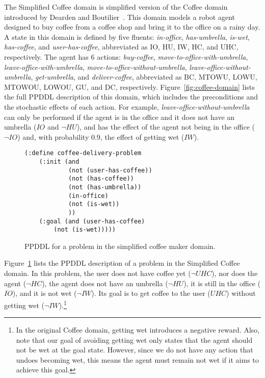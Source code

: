 \documentclass[letterpaper]{article} %
\newcommand{\inoffice}{\textit{in-office}\xspace}
\newcommand{\hasumbrella}{\textit{has-umbrella}\xspace}
\newcommand{\iswet}{\textit{is-wet}\xspace}
\newcommand{\hascoffee}{\textit{has-coffee}\xspace}
\newcommand{\userhascofee}{\textit{user-has-coffee}\xspace}
\newcommand{\buycofee}{\textit{buy-coffee}\xspace}
\newcommand{\movetoofficewithumbrella}{\textit{move-to-office-with-umbrella}\xspace}
\newcommand{\leaveofficewithumbrella}{\textit{leave-office-with-umbrella}\xspace}
\newcommand{\movetoofficewithoutumbrella}{\textit{move-to-office-without-umbrella}\xspace}
\newcommand{\leaveofficewithoutumbrella}{\textit{leave-office-without-umbrella}\xspace}
\newcommand{\getumbrella}{\textit{get-umbrella}\xspace}
\newcommand{\delivercoffee}{\textit{deliver-coffee}\xspace}
\begin{document}
The Simplified Coffee domain is simplified version of the Coffee domain introduced by Dearden and Boutilier~. 
This domain models a robot agent designed to buy coffee from a coffee shop and bring it to the office on a rainy day. 
A state in this domain is defined by five fluents: \inoffice, \hasumbrella, \iswet, \hascoffee, and \userhascofee, abbreviated as IO, HU, IW, HC, and UHC, respectively. 
The agent has 6 actions:
\buycofee, 
\movetoofficewithumbrella, 
\leaveofficewithumbrella, 
\movetoofficewithoutumbrella,
\leaveofficewithoutumbrella, 
\getumbrella,
and 
\delivercoffee, abbreviated as BC, MTOWU, LOWU, MTOWOU, LOWOU, GU, and DC, respectively. 
Figure~\ref{fig:coffee-domain} lists the full PPDDL description of this domain, which includes the preconditions and the stochastic effects of each action. 
For example, \leaveofficewithoutumbrella can only be performed if the agent is in the office and it does not have an umbrella ($IO$ and $\neg HU$), and has the effect of the agent not being in the office ($\neg IO$) and, with probability 0.9, the effect of getting wet ($IW$). 


\begin{figure}
    \centering
    \begin{verbatim}
(:define coffee-delivery-problem
    (:init (and 
            (not (user-has-coffee))
            (not (has-coffee))
            (not (has-umbrella))
            (in-office)
            (not (is-wet))
            ))
    (:goal (and (user-has-coffee) 
        (not (is-wet)))))               
    \end{verbatim}
    \caption{PPDDL for a problem in the simplified coffee maker domain.}
    \label{fig:coffee-problem}
\end{figure}
Figure~\ref{fig:coffee-problem} lists the PPDDL description of a problem in the Simplified Coffee domain. 
In this problem, the user does not have coffee yet ($\neg UHC$), 
nor does the agent ($\neg HC$), 
the agent does not have an umbrella ($\neg HU$), it is still in the office ($IO$), 
and it is not wet ($\neg IW$). 
Its goal is to get coffee to the user ($UHC$) without getting wet ($\neg IW$).\footnote{In the original Coffee domain, getting wet introduces a negative reward. Also, note that our goal of avoiding getting wet only states that the agent should not be wet at the goal state. However, since we do not have any action that undoes becoming wet, this means the agent must remain not wet if it aims to achieve this goal.}
\end{document}
